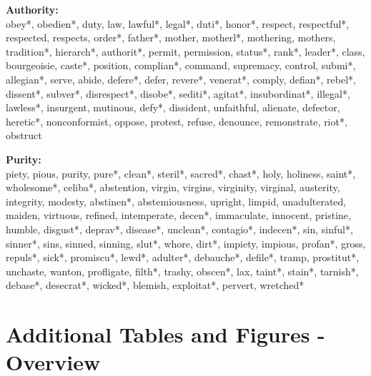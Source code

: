 \documentclass[12pt]{article}
\begin{document}
\textbf{Authority:}\\
obey*, obedien*, duty, law, lawful*, legal*, duti*, honor*, respect, respectful*, respected, respects, order*, father*, mother, motherl*, mothering, mothers, tradition*, hierarch*, authorit*, permit, permission, status*, rank*, leader*, class, bourgeoisie, caste*, position, complian*, command, supremacy, control, submi*, allegian*, serve, abide, defere*, defer, revere*, venerat*, comply, defian*, rebel*, dissent*, subver*, disrespect*, disobe*, sediti*, agitat*, insubordinat*, illegal*, lawless*, insurgent, mutinous, defy*, dissident, unfaithful, alienate, defector, heretic*, nonconformist, oppose, protest, refuse, denounce, remonstrate, riot*, obstruct
\vspace{.5cm}

\textbf{Purity:}\\
piety, pious, purity, pure*, clean*, steril*, sacred*, chast*, holy, holiness, saint*, wholesome*, celiba*, abstention, virgin, virgins, virginity, virginal, austerity, integrity, modesty, abstinen*, abstemiousness, upright, limpid, unadulterated, maiden, virtuous, refined, intemperate, decen*, immaculate, innocent, pristine, humble, disgust*, deprav*, disease*, unclean*, contagio*, indecen*, sin, sinful*, sinner*, sins, sinned, sinning, slut*, whore, dirt*, impiety, impious, profan*, gross, repuls*, sick*, promiscu*, lewd*, adulter*, debauche*, defile*, tramp, prostitut*, unchaste, wanton, profligate, filth*, trashy, obscen*, lax, taint*, stain*, tarnish*, debase*, desecrat*, wicked*, blemish, exploitat*, pervert, wretched*


\clearpage
\section{Additional Tables and Figures - Overview}
\renewcommand\thefigure{\thesection.\arabic{figure}}
\renewcommand\thetable{\thesection.\arabic{table}}
\setcounter{figure}{0}
\setcounter{table}{0}


\end{document}

